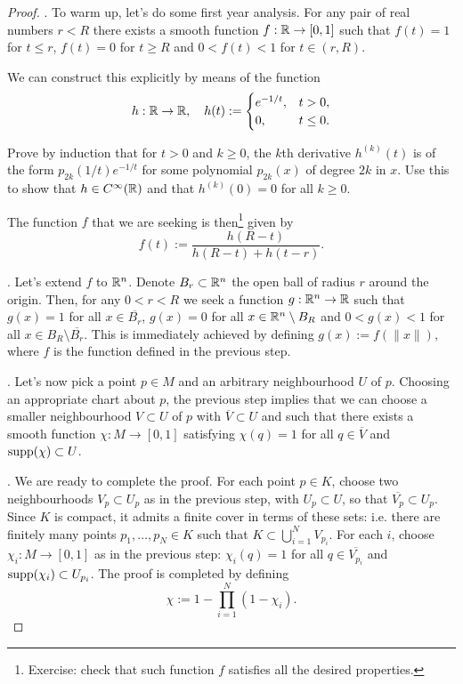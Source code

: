 \begin{proof}
	.
	To warm up, let's do some first year analysis.
	For any pair of real numbers $r < R$ there exists a smooth function $f: \mathbb{R} \to [0,1]$ such that $f(t) = 1$ for $t \leq r$, $f(t) = 0$ for $t \geq R$ and $0<f(t)<1$ for $t\in(r,R)$.

	We can construct this explicitly by means of the function
	\begin{equation}
		h:\mathbb{R}\to\mathbb{R}, \quad h(t):= \begin{cases}
			e^{-1/t}, & t>0,      \\
			0,        & t \leq 0.
		\end{cases}
	\end{equation}

	\begin{exercise}
		Prove by induction that for $t>0$ and $k\geq 0$, the $k$th derivative $h^{(k)}(t)$ is of the form $p_{2k}(1/t)e^{-1/t}$ for some polynomial $p_{2k}(x)$ of degree $2k$ in $x$.
		Use this to show that $h\in C^\infty(\mathbb{R})$ and that $h^{(k)}(0) = 0$ for all $k\geq 0$.
	\end{exercise}

	The function $f$ that we are seeking is then\footnote{Exercise: check that such function $f$ satisfies all the desired properties.} given by
	\begin{equation}
		f(t) := \frac{h(R-t)}{h(R-t) + h(t-r)}.
	\end{equation}

	.
	Let's extend $f$ to $\mathbb{R}^n$.
	Denote $B_r \subset \mathbb{R}^n$ the open ball of radius $r$ around the origin.
	Then, for any $0 < r < R$ we seek a function $g:\mathbb{R}^n\to\mathbb{R}$ such that $g(x) = 1$ for all $x\in \overline{B_r}$, $g(x) = 0$ for all $x\in \mathbb{R}^n\setminus B_R$ and $0< g(x)< 1$ for all $x\in B_R\setminus\overline{B_r}$.
	This is immediately achieved by defining $g(x) := f(\|x\|)$, where $f$ is the function defined in the previous step.

	.
	Let's now pick a point $p\in M$ and an arbitrary neighbourhood $U$ of $p$. Choosing an appropriate chart about $p$, the previous step implies that we can choose a smaller neighbourhood $V\subset U$ of $p$ with $\overline V\subset U$ and such that there exists a smooth function $\chi: M \to [0,1]$ satisfying $\chi(q) = 1$ for all $q\in\overline{V}$ and $\operatorname{supp}(\chi)\subset U$.

	.
	We are ready to complete the proof.
	For each point $p\in K$, choose two neighbourhoods $V_p \subset U_p$ as in the previous step, with $U_p \subset U$, so that $\overline{V_p}\subset U_p$.
	Since $K$ is compact, it admits a finite cover in terms of these sets: i.e. there are finitely many points $p_1, \ldots, p_N \in K$ such that $K \subset \bigcup_{i=1}^N V_{p_i}$.
	For each $i$, choose $\chi_i: M \to [0,1]$ as in the previous step: $\chi_i(q) = 1$ for all $q\in\overline{V_{p_i}}$ and $\operatorname{supp}(\chi_i)\subset U_{p_i}$.
	The proof is completed by defining
	\begin{equation}
		\chi := 1 - \prod_{i=1}^N(1 - \chi_i).
	\end{equation}
\end{proof}

